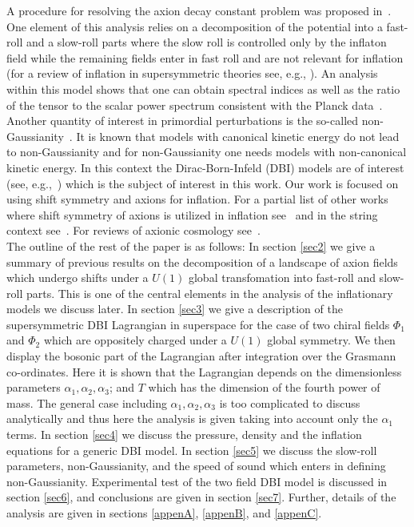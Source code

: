 \documentclass[a4paper,11pt]{article}
\begin{document}
  A procedure for resolving the axion decay constant problem was proposed in~\cite{Nath:2017ihp}.
  One element of this analysis relies on a
  decomposition of the potential into a fast-roll and a slow-roll parts where the slow roll is controlled only by the inflaton field while the remaining fields enter in fast roll and are not relevant for
  inflation~\cite{Nath:2017ihp} (for a review of inflation in supersymmetric theories see, e.g., \cite{Nath:2016qzm}).
  An analysis within this model shows that one can obtain
  spectral indices as well as the ratio of the tensor to the scalar power spectrum consistent with the Planck data~\cite{Adam:2015rua,Ade:2015lrj,Array:2015xqh}.
  Another quantity of interest in primordial perturbations is the so-called non-Gaussianity~\cite{Maldacena:2002vr,Seery:2005wm,Seery:2005gb,Chen:2005fe,Chen:2006nt,Lyth:2005fi}. It is known that models
  with canonical kinetic energy do not lead to non-Gaussianity and for non-Gaussianity one needs models
  with non-canonical kinetic energy. In this context the Dirac-Born-Infeld (DBI) models are of interest (see, e.g.,~\cite{Alishahiha:2004eh,Easson:2007dh,Huang:2007hh,Gordon:2000hv,Langlois:2008wt}) which is the subject of interest in this work.
  Our work is focused on using shift symmetry and axions for inflation. For a partial list of other works where
  shift symmetry of axions is utilized in inflation
  see~\cite{ArkaniHamed:2003mz,Kaplan:2003aj,Green:2009ds,Higaki:2014pja,Higaki:2014mwa,Kadota:2016jlw,Kobayashi:2016vcx}
  and in the string context see~\cite{Kachru:2003sx,BlancoPillado:2004ns,Cicoli:2016olq}.
  For reviews of axionic cosmology see~\cite{Pajer:2013fsa,Marsh:2015xka}.\\


  The outline of the rest of the paper is as follows: In section \ref{sec2} we
  give a summary of previous results on the decomposition of a landscape of axion fields which undergo shifts
  under a $U(1)$ global transfomation into fast-roll and slow-roll parts.
  This is one of the central elements in the
  analysis of the inflationary models we discuss later.
  In section \ref{sec3} we give a description of the supersymmetric DBI Lagrangian
  in superspace for the case of two chiral fields $\Phi_1$ and $\Phi_2$ which are oppositely charged under a $U(1)$ global symmetry.
  We then display the bosonic part of the Lagrangian after integration over the Grasmann co-ordinates.
  Here it is shown that the Lagrangian depends on the dimensionless parameters $\alpha_1, \alpha_2, \alpha_3$; and $T$
  which has the dimension of the fourth power of mass. The general case including $\alpha_1, \alpha_2, \alpha_3$
  is too complicated to discuss analytically and thus here the analysis is given taking into account only the $\alpha_1$ terms.
  In section \ref{sec4} we discuss the pressure, density and the inflation equations for a generic DBI model. In section \ref{sec5} we
  discuss the slow-roll parameters, non-Gaussianity, and the speed of sound which enters in defining non-Gaussianity.
  Experimental test of the two field DBI model is discussed in section \ref{sec6}, and conclusions are given in section \ref{sec7}.
  Further, details of the analysis are given in sections \ref{appenA}, \ref{appenB}, and \ref{appenC}.
 
\end{document}
